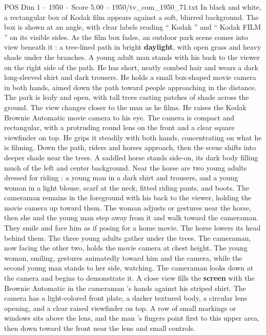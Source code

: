 \begin{textsample}{POS Dim 1 – 1950 – Score 5.00 – 1950/tv\_com\_1950\_71.txt}  \label{ex:f1_pos_086}
In black and white, a rectangular box of Kodak film appears against a soft, blurred background.
The box is shown at an angle, with clear labels reading “ Kodak ” and “ Kodak FILM ” on its visible sides.
As the film box fades, an outdoor park scene comes into view beneath it : a tree-lined path in bright \textbf{daylight}, with open grass and heavy shade under the branches.
A young adult man stands with his back to the viewer on the right side of the path.
He has short, neatly combed hair and wears a dark long-sleeved shirt and dark trousers.
He holds a small box-shaped movie camera in both hands, aimed down the path toward people approaching in the distance.
The park is leafy and open, with tall trees casting patches of shade across the ground.
The view changes closer to the man as he films.
He raises the Kodak Brownie Automatic movie camera to his eye.
The camera is compact and rectangular, with a protruding round lens on the front and a clear square viewfinder on top.
He grips it steadily with both hands, concentrating on what he is filming.
Down the path, riders and horses approach, then the scene shifts into deeper shade near the trees.
A saddled horse stands side-on, its dark body filling much of the left and center background.
Near the horse are two young adults dressed for riding : a young man in a dark shirt and trousers, and a young woman in a light blouse, scarf at the neck, fitted riding pants, and boots.
The cameraman remains in the foreground with his back to the viewer, holding the movie camera up toward them.
The woman adjusts or gestures near the horse, then she and the young man step away from it and walk toward the cameraman.
They smile and face him as if posing for a home movie.
The horse lowers its head behind them.
The three young adults gather under the trees.
The cameraman, now facing the other two, holds the movie camera at chest height.
The young woman, smiling, gestures animatedly toward him and the camera, while the second young man stands to her side, watching.
The cameraman looks down at the camera and begins to demonstrate it.
A close view fills the \textbf{screen} with the Brownie Automatic in the cameraman ’s hands against his striped shirt.
The camera has a light-colored front plate, a darker textured body, a circular lens opening, and a clear raised viewfinder on top.
A row of small markings or windows sits above the lens, and the man ’s fingers point first to this upper area, then down toward the front near the lens and small controls.

\end{textsample}
